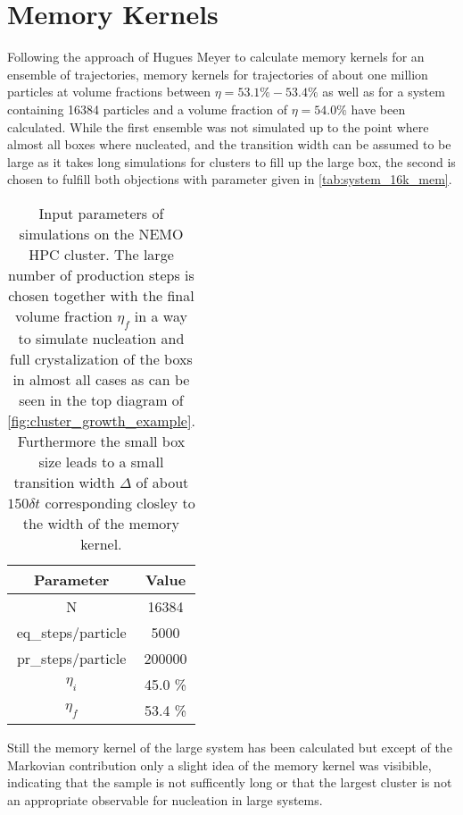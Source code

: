\section{Memory Kernels}
\label{sec:memory_kernels}

Following the approach of Hugues Meyer to calculate memory kernels for an ensemble of trajectories, memory kernels for trajectories of about one million particles at volume fractions between $\eta = 53.1\% - 53.4\%$ as well as for a system containing 16384 particles and a volume fraction of $\eta = 54.0\% $ have been calculated. While the first ensemble was not simulated up to the point where almost all boxes where nucleated, and the transition width can be assumed to be large as it takes long simulations for clusters to fill up the large box, the second is chosen to fulfill both objections with parameter given in \autoref{tab:system_16k_mem}.\\

\begin{table}[ht]
\centering
\begin{tabular}{c|c}
Parameter & Value \\ \hline
N & 16384 \\
eq\_steps/particle & 5000 \\
pr\_steps/particle & 200000 \\
$\eta_i$ & 45.0 \% \\
$\eta_f$ & 53.4 \% \\
\end{tabular}
\caption[Simulation parameters of data production system with 16384 particles]{Input parameters of simulations on the NEMO HPC cluster. The large number of production steps is chosen together with the final volume fraction $\eta_f$ in a way to simulate nucleation and full crystalization of the boxs in almost all cases as can be seen in the top diagram of \autoref{fig:cluster_growth_example}. Furthermore the small box size leads to a small transition width $\Delta$ of about $150 \delta t$  corresponding closley to the width of the memory kernel.} 
\label{tab:system_16k_mem}
\end{table}



Still the memory kernel of the large system has been calculated but except of the Markovian contribution only a slight idea of the memory kernel was visibible, indicating that the sample is not sufficently long or that the largest cluster is not an appropriate observable for nucleation in large systems.\\



